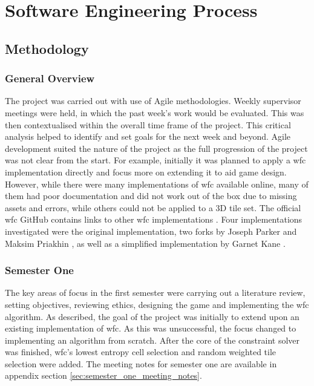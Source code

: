 \chapter{Software Engineering Process}
\section{Methodology}
\subsection{General Overview}
The project was carried out with use of Agile methodologies. Weekly supervisor meetings were held, in which the past week's work would be evaluated. This was then contextualised within the overall time frame of the project. This critical analysis helped to identify and set goals for the next week and beyond. Agile development suited the nature of the project as the full progression of the project was not clear from the start. For example, initially it was planned to apply a \acrlong{wfc} implementation directly and focus more on extending it to aid game design. However, while there were many implementations of \acrshort{wfc} available online, many of them had poor documentation and did not work out of the box due to missing assets and errors, while others could not be applied to a 3D tile set. The official \acrlong{wfc} GitHub contains links to other \acrshort{wfc} implementations \cite{Gumin_Wave_Function_Collapse_2016}. Four implementations investigated were the original implementation, two forks by Joseph Parker \cite{unity-WFC} and Maksim Priakhin \cite{unity-WFC-3D}, as well as a simplified implementation by Garnet Kane \cite{Easy_WFC}.

\subsection{Semester One}
The key areas of focus in the first semester were carrying out a literature review, setting objectives, reviewing ethics, designing the game and implementing the \acrshort{wfc} algorithm. As described, the goal of the project was initially to extend upon an existing implementation of \acrshort{wfc}. As this was unsuccessful, the focus changed to implementing an algorithm from scratch. After the core of the constraint solver was finished, \acrshort{wfc}'s lowest entropy cell selection and random weighted tile selection were added. The meeting notes for semester one are available in appendix section \ref{sec:semester_one_meeting_notes}.

